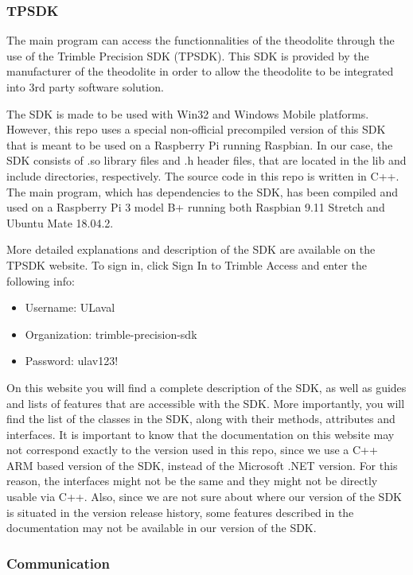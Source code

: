 \documentclass[10pt,letterpaper,oneside]{article}
\begin{document}
\subsubsection{TPSDK}

The main program can access the functionnalities of the theodolite through the use of the Trimble Precision SDK (TPSDK). 
This SDK is provided by the manufacturer of the theodolite in order to allow the theodolite to be integrated into 3rd party software solution.

The SDK is made to be used with Win32 and Windows Mobile platforms. 
However, this repo uses a special non-official precompiled version of this SDK that is meant to be used on a Raspberry Pi running Raspbian. 
In our case, the SDK consists of .so library files and .h header files, that are located in the lib and include directories, respectively. 
The source code in this repo is written in C++. 
The main program, which has dependencies to the SDK, has been compiled and used on a Raspberry Pi 3 model B+ running both Raspbian 9.11 Stretch and Ubuntu Mate 18.04.2.

More detailed explanations and description of the SDK are available on the TPSDK website. 
To sign in, click Sign In to Trimble Access and enter the following info:

\begin{itemize}
	\item Username: ULaval
    \item Organization: trimble-precision-sdk
    \item Password: ulav123!
\end{itemize}    

On this website you will find a complete description of the SDK, as well as guides and lists of features that are accessible with the SDK. 
More importantly, you will find the list of the classes in the SDK, along with their methods, attributes and interfaces. 
It is important to know that the documentation on this website may not correspond exactly to the version used in this repo, since we use a C++ ARM based version of the SDK, instead of the Microsoft .NET version. 
For this reason, the interfaces might not be the same and they might not be directly usable via C++.
Also, since we are not sure about where our version of the SDK is situated in the version release history, some features described in the documentation may not be available in our version of the SDK.

\subsubsection{Communication}
\end{document}
